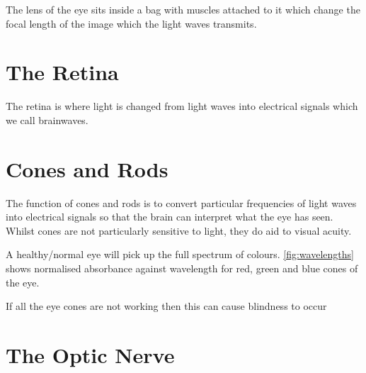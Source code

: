 The lens of the eye sits inside a bag with muscles attached to it which change
the focal length of the image which the light waves transmits.

\section{The Retina}
The retina is where light is changed from light waves into electrical signals
which we call brainwaves.

\section{Cones and Rods}

The function of cones and rods is to convert particular frequencies of light
waves
into electrical signals so that the brain can interpret what the eye has seen.
Whilst cones are not particularly sensitive to light, they do aid to visual
acuity.
\cite{}

A healthy/normal eye will pick up the full spectrum of colours.
\ref{fig:wavelengths} shows normalised absorbance against wavelength for red,
green and blue cones of the eye.

If all the eye cones are not working then this can cause
blindness to occur\cite{}

\section{The Optic Nerve}
